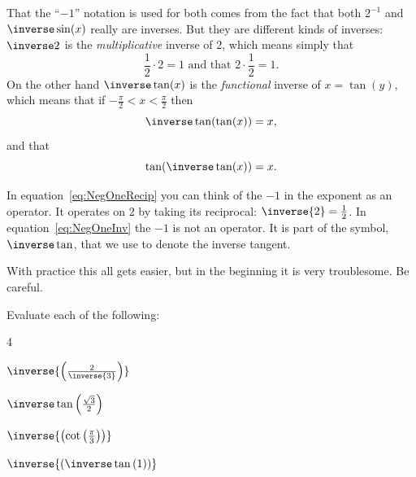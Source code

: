 \begin{Digression}
  That the ``$-1$'' notation is
  used for both comes from the fact that both $2^{-1}$ and
  $\inverse\sin(x)$ really are inverses. But they are different kinds
  of inverses: $\inverse2$ is the \emph{multiplicative} inverse of
  $2$, which means simply that
  $$\frac12\cdot2=1 \text{ and that } 2\cdot\frac12 =1.$$ 
  On the other hand $\inverse\tan(x)$ is the \emph{functional} inverse of
  $x=\tan(y)$, which means that if
  $-\frac{\pi}{2}\lt{}x\lt{}\frac{\pi}{2}$ then
  $$
  \inverse\tan(\tan(x)) = x, 
  $$
  and that
  $$
  \tan(\inverse\tan(x))=x.
  $$

  In equation~\ref{eq:NegOneRecip} you can think of the $-1$ in the
  exponent as an operator. It operates on $2$ by taking its
  reciprocal: $\inverse{2}=\frac12$. In equation~\ref{eq:NegOneInv}
  the $-1$ is not an operator. It is part of the symbol,
  $\inverse\tan$, that we use to denote the inverse tangent.
  
  With practice this all gets easier, but in the beginning it is very
  troublesome. Be careful.

  \begin{ProficiencyDrill}
    Evaluate each of the following:
           \begin{enumerate}[label={\bf{}(\alph*)}]{}
        \begin{multicols}{4}
         \item $\inverse{\left(\frac{2}{\inverse{3}}\right)}$
         \item $\inverse\tan\left(\frac{\sqrt{3}}{2}\right)$
         \item $\inverse{\left(\cot\left(\frac{\pi}{3}\right)\right)}$
         \item $\inverse{\left(\inverse\tan\left(1\right)\right)}$
        \end{multicols}
       \end{enumerate}
     \end{ProficiencyDrill}

\end{Digression}

